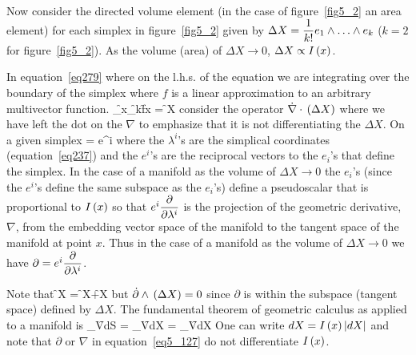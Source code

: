 Now consider the directed volume element (in the case of figure~\ref{fig5_2} an area element) for each simplex in
figure~\ref{fig5_2} given by $\Delta X = \bfrac{1}{k!}e_{1}\W\dots\W e_{k}$ ($k=2$ for figure~\ref{fig5_2}).  As
the volume (area) of $\Delta X\rightarrow 0$, $\Delta X \propto {I}\left ( {x} \right )$.

In equation~\ref{eq279} where on the l.h.s. of the equation we are integrating over the boundary of the simplex where
$f$ is a linear approximation to an arbitrary multivector function.
\be
 \oint_{\f{\partial}{x}_{\f{}{k}}}\hspace{-15pt}\f{f}{x} = \dot{\nabla}\cdot\f{}{\Delta X} \nonumber
\ee
consider the operator $\dot{\nabla}\cdot{}\left ( {\Delta X} \right )$ where we have left the dot on the $\nabla$ to emphasize that it is not
differentiating the $\Delta X$. On a given simplex
\be
	\nabla = e^{i}
\ee
where the $\lambda^{i}$'s are the simplical coordinates (equation~\ref{eq237}) and the $e^{i}$'s are the reciprocal vectors to the $e_{i}$'s that
define the simplex.  In the case of a manifold as the volume of $\Delta X \rightarrow 0$ the $e_{i}$'s (since the $e^{i}$'s
define the same subspace as the $e_{i}$'s) define a pseudoscalar that is proportional to ${I}\left ( {x} \right )$ so that $e^{i}\displaystyle\frac{\partial{}}{\partial{\lambda^{i}}}$
is the projection of the geometric derivative, $\nabla$, from the embedding vector space of the manifold to the tangent space
of the manifold at point $x$.  Thus in the case of a manifold as the volume of $\Delta X \rightarrow 0$ we have 
$\partial = e^{i}\displaystyle\frac{\partial{}}{\partial{\lambda^{i}}}$.

Note that
\be
	\dot{\partial}\f{}{\Delta X} = \dot{\partial}\cdot\f{}{\Delta X}+\dot{\partial}\W\f{}{\Delta X}
\ee
but $\dot{\partial}\wedge{}\left ( {\Delta X} \right ) = 0$ since $\partial$ is within the subspace (tangent space) defined by $\Delta X$.  The
fundamental theorem of geometric calculus as applied to a manifold is
\be\label{eq5_127}
	\oint_{\partial V}\f{\Llin}{dS} =  \int_{V}\f{\dot{\Llin}}{\dot{\nabla}\cdot dX} = \int_{V}\f{\dot{\Llin}}{\dot{\partial}dX}
\ee
One can write $dX = {I}\left ( {x} \right )\left | {dX} \right |$ and note that $\partial$ or $\nabla$ in equation~\ref{eq5_127} do not differentiate ${I}\left ( {x} \right )$.
